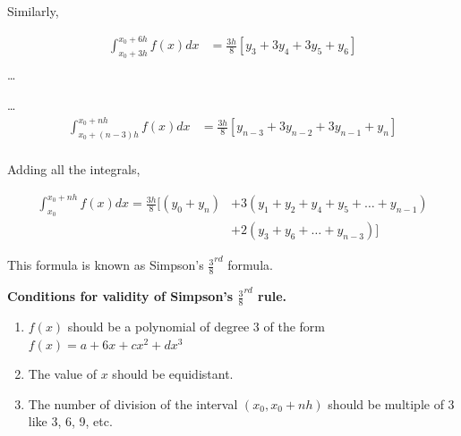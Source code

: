 \documentclass[11pt, a4paper, oneside]{book}
\begin{document}
          Similarly,

          \begin{align*}
            \int_{x_0+3h}^{x_0+6h}f(x)dx &= \frac{3h}{8}[y_3+3y_4+3y_5+y_6]\\
          \end{align*}
          \dots

          \dots
          \begin{align*}
            \int_{x_0+(n-3)h}^{x_0+nh}f(x)dx &= \frac{3h}{8}[y_{n-3}+3y_{n-2}+3y_{n-1}+y_n]\\
          \end{align*}

          Adding all the integrals,

          \begin{align*}
            \int_{x_0}^{x_0+nh}f(x)dx=\frac{3h}{8}[(y_0+y_n) &+ 3(y_1+y_2+y_4+y_5+\dots+y_{n-1})\\
                                                             &+ 2(y_3+y_6+\dots+y_{n-3})]
          \end{align*}

          This formula is known as Simpson's $\frac{3}{8}^{rd}$ formula.

          \textbf{Conditions for validity of Simpson's $\frac{3}{8}^{rd}$ rule.}

          \begin{enumerate}
            \item $f(x)$ should be a polynomial of degree 3 of the form
              $f(x)=a+6x+cx^2+dx^3$
            \item The value of $x$ should be equidistant.
            \item The number of division of the interval $(x_0,x_0+nh)$
              should be multiple of 3 like 3, 6, 9, etc.
          \end{enumerate}

\end{document}
